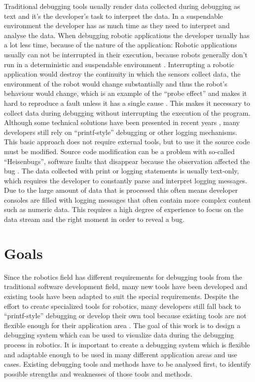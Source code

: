 Traditional debugging tools usually render data collected during debugging as text and it's the developer's task to interpret the data. In a suspendable environment the developer has as much time as they need to interpret and analyse the data. When debugging robotic applications the developer usually has a lot less time, because of the nature of the application: Robotic applications usually can not be interrupted in their execution, because robots generally don't run in a deterministic and suspendable environment \cite{Gumbley2009}. Interrupting a robotic application would destroy the continuity in which the sensors collect data, the environment of the robot would change substantially and thus the robot's behaviour would change, which is an example of the ``probe effect'' and makes it hard to reproduce a fault unless it has a single cause \cite{Gumbley2009}. This makes it necessary to collect data during debugging without interrupting the execution of the program. Although some technical solutions have been presented in recent years \cite{Gumbley2009}, many developers still rely on ``printf-style'' debugging or other logging mechanisms. This basic approach does not require external tools, but to use it the source code must be modified. Source code modification can be a problem with so-called ``Heisenbugs'', software faults that disappear because the observation affected the bug \cite{Grottke2005}. The data collected with print or logging statements is usually text-only, which requires the developer to constantly parse and interpret logging messages. Due to the large amount of data that is processed this often means developer consoles are filled with logging messages that often contain more complex content such as numeric data. This requires a high degree of experience to focus on the data stream and the right moment in order to reveal a bug.


\section{Goals}
Since the robotics field has different requirements for debugging tools from the traditional software development field, many new tools have been developed and existing tools have been adapted to suit the special requirements. Despite the effort to create specialized tools for robotics, many developers still fall back to ``printf-style'' debugging or develop their own tool because existing tools are not flexible enough for their application area \cite{Collett2010}. The goal of this work is to design a debugging system which can be used to visualize data during the debugging process in robotics. It is important to create a debugging system which is flexible and adaptable enough to be used in many different application areas and use cases. Existing debugging tools and methods have to be analysed first, to identify possible strengths and weaknesses of those tools and methods.

